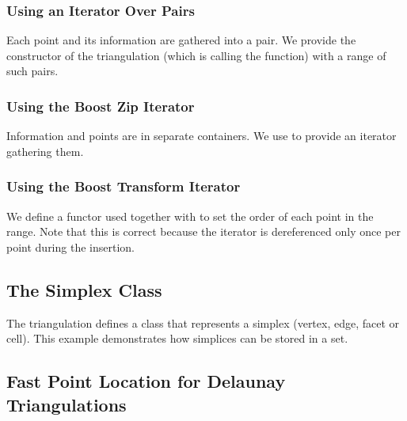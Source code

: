 \subsubsection{Using an Iterator Over Pairs}
Each point and its information are gathered into a pair. We provide
the constructor of the triangulation (which is calling the  function)
with a range of such pairs.


\subsubsection{Using the Boost Zip Iterator}

Information and points are in separate containers. We use
{} to provide an iterator gathering them.


\subsubsection{Using the Boost Transform Iterator}

We define a functor  used together with
{} to set the order of each point
in the range. Note that this is correct because the iterator
is dereferenced only once per point during the insertion.


\subsection{The Simplex Class\label{Triangulation3-sec-simplex}}
The triangulation defines a  class that represents a
simplex (vertex, edge, facet or cell). This example demonstrates how
simplices can be stored in a set.



\subsection{Fast Point Location for Delaunay Triangulations\label{Triangulation3-ex-fast-location}}

